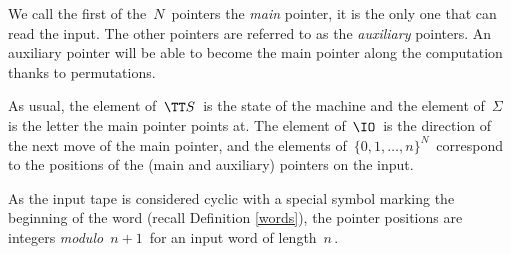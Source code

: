 We call the first of the $\,N\,$ pointers the \emph{main} pointer, it is the only one that can read the input.
The other pointers are referred to as the \emph{auxiliary} pointers.
An auxiliary pointer will be able to become the main pointer along the computation thanks to permutations.

As usual, the element of $\,\TT S\,$ is the state of the machine and the element of $\,\Sigma\,$ is the letter the main pointer points at.
The element of $\,\IO\,$ is the direction of the next move of the main pointer, and the elements of $\,\{0,1,\dots,n\}^N\,$ correspond to the positions of the (main and auxiliary)  pointers on the input.

\smallskip

As the input tape is considered cyclic with a special symbol marking the beginning of the word (recall Definition \ref{words}), the pointer positions are integers \emph{modulo} $\,n+1\,$ for an input word of length $\,n\,$.

